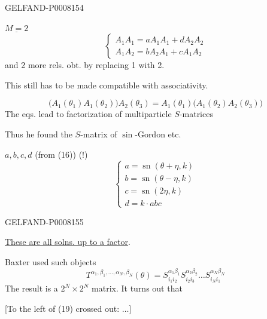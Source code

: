 \begin{GelfandAdjacentEvidence}{GELFAND-P000815}{4}

\(\underline{M=2}\)
\begin{equation*}
\begin{cases}
A_1A_1=aA_1A_1+dA_2A_2\\
A_1A_2=bA_2A_1+cA_1A_2
\end{cases}\tag{16}
\end{equation*}
and 2 more rels. obt. by replacing 1 with 2.

This still has to be made compatible with associativity.

\[
\bigl(A_1(\theta_1)A_1(\theta_2)\bigr)A_2(\theta_3)
=A_1(\theta_1)\bigl(A_1(\theta_2)A_2(\theta_3)\bigr)
\]
The eqs. lead to factorization of multiparticle \(S\)-matrices

Thus he found the \(S\)-matrix of \(\sin\)-Gordon etc.

 \(a,b,c,d\) (from (16))  (!)
\begin{equation*}
\begin{cases}
a=\operatorname{sn}(\theta+\eta,k)\\
b=\operatorname{sn}(\theta-\eta,k)\\
c=\operatorname{sn}(2\eta,k)\\
d=k\cdot abc
\end{cases}\tag{17}
\end{equation*}
\end{GelfandAdjacentEvidence}
\begin{GelfandAdjacentEvidence}{GELFAND-P000815}{5}


\uline{These are all solns. up to a factor}.

Baxter used such objects
\begin{equation*}
T^{\alpha_1,\beta_1,\ldots,\alpha_N,\beta_N}(\theta)
=S_{i_1i_2}^{\alpha_1\beta_1}S_{i_2i_3}^{\alpha_2\beta_2}
\ldots S_{i_Ni_1}^{\alpha_N\beta_N}\tag{18}
\end{equation*}
The result is a \(2^N\times2^N\) matrix. It turns out that

[To the left of (19) crossed out: \(\ldots\)]
\end{GelfandAdjacentEvidence}
